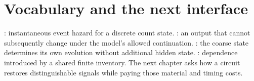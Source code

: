 \section{Vocabulary and the next interface}
: instantaneous event hazard for a discrete count state.
: an output that cannot subsequently change under the
model's allowed continuation.
: the coarse state determines its own evolution
without additional hidden state.
: dependence introduced by a shared finite inventory.
The next chapter asks how a circuit restores distinguishable signals while
paying those material and timing costs.
